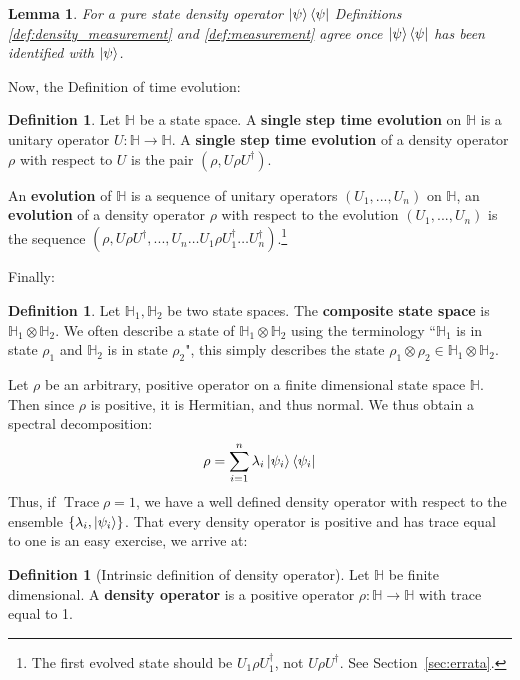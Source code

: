 \documentclass[12pt]{article}
\theoremstyle{plain}
\newtheorem{lemma}[thm]{Lemma}
\theoremstyle{definition}
\newtheorem{defn}[thm]{Definition} %
\newcommand{\bb}[1]{\mathbb{#1}}
\newcommand{\lto}{\longrightarrow}
\begin{document}
\begin{lemma}
For a pure state density operator $\ket{\psi}\bra{\psi}$ Definitions \ref{def:density_measurement} and \ref{def:measurement} agree once $\ket{\psi}\bra{\psi}$ has been identified with $\ket{\psi}$.
\end{lemma}
Now, the Definition of time evolution:
\begin{defn}
Let $\bb{H}$ be a state space. A \textbf{single step time evolution} on $\bb{H}$ is a unitary operator $U: \bb{H} \lto \bb{H}$. A \textbf{single step time evolution} of a density operator $\rho$ with respect to $U$ is the pair $(\rho, U\rho U^\dagger)$.

An \textbf{evolution} of $\bb{H}$ is a sequence of unitary operators $(U_1,...,U_n)$ on $\bb{H}$, an \textbf{evolution} of a density operator $\rho$ with respect to the evolution $(U_1,...,U_n)$ is the sequence $(\rho, U\rho U^\dagger, ..., U_n\hdots U_1 \rho U_1^\dagger \hdots U_n^\dagger)$.\footnote{The first evolved state should be $U_1\rho U_1^\dagger$, not $U\rho U^\dagger$. See Section~\ref{sec:errata}.}
\end{defn}
Finally:
\begin{defn}
Let $\bb{H}_1,\bb{H}_2$ be two state spaces. The \textbf{composite state space }is $\bb{H}_1 \otimes \bb{H}_2$. We often describe a state of $\bb{H}_1 \otimes \bb{H}_2$ using the terminology ``$\bb{H}_1$ is in state $\rho_1$ and $\bb{H}_2$ is in state $\rho_2$",  this simply describes the state $\rho_1 \otimes \rho_2 \in \bb{H}_1 \otimes \bb{H}_2$.
\end{defn}
Let $\rho$ be an arbitrary, positive operator on a finite dimensional state space $\bb{H}$. Then since $\rho$ is positive, it is Hermitian, and thus normal. We thus obtain a spectral decomposition:
\begin{equation}
\rho = \sum_{i = 1}^n \lambda_i \ket{\psi_i}\bra{\psi_i}
\end{equation}
Thus, if $\operatorname{Trace}\rho = 1$, we have a well defined density operator with respect to the ensemble $\lbrace \lambda_i, \ket{\psi_i}\rbrace$. That every density operator is positive and has trace equal to one is an easy exercise, we arrive at:
\begin{defn}[Intrinsic definition of density operator]
Let $\bb{H}$ be finite dimensional. A \textbf{density operator} is a positive operator $\rho: \bb{H} \lto \bb{H}$ with trace equal to 1.
\end{defn}
\end{document}
